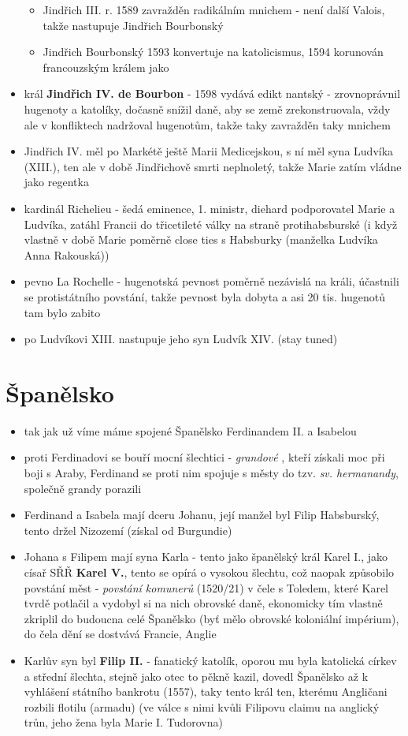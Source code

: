 \documentclass{article}
\begin{document}
\begin{itemize}
\begin{itemize}
    \item Jindřich III. r. 1589 zavražděn radikálním mnichem - není další Valois, takže nastupuje Jindřich Bourbonský
    \item Jindřich Bourbonský 1593 konvertuje na katolicismus, 1594 korunován francouzským králem jako
  \end{itemize}
  \item král \textbf{Jindřich IV. de Bourbon} - 1598 vydává edikt nantský - zrovnoprávnil hugenoty a katolíky, dočasně snížil daně, aby se země zrekonstruovala, vždy ale v konfliktech nadržoval hugenotům, takže taky zavražděn taky mnichem
  \item Jindřich IV. měl po Markétě ještě Marii Medicejskou, s ní měl syna Ludvíka (XIII.), ten ale v době Jindřichově smrti neplnoletý, takže Marie zatím vládne jako regentka
  \item kardinál Richelieu - šedá eminence, 1. ministr, diehard podporovatel Marie a Ludvíka, zatáhl Francii do třicetileté války na straně protihabsburské (i když vlastně v době Marie poměrně close ties s Habsburky (manželka Ludvíka Anna Rakouská))
  \item pevno La Rochelle - hugenotská pevnost poměrně nezávislá na králi, účastnili se protistátního povstání, takže pevnost byla dobyta a asi 20 tis. hugenotů tam bylo zabito
  \item po Ludvíkovi XIII. nastupuje jeho syn Ludvík XIV. (stay tuned)
\end{itemize}

\section{Španělsko}
\begin{itemize}
  \item tak jak už víme máme spojené Španělsko Ferdinandem II. a Isabelou
  \item proti Ferdinadovi se bouří mocní šlechtici - \textit{grandové} , kteří získali moc při boji s Araby, Ferdinand se proti nim spojuje s městy do tzv. \textit{sv. hermanandy}, společně grandy porazili
  \item Ferdinand a Isabela mají dceru Johanu, její manžel byl Filip Habsburský, tento držel Nizozemí (získal od Burgundie)
  \item Johana s Filipem mají syna Karla - tento jako španělský král Karel I., jako císař SŘŘ \textbf{Karel V.}, tento se opírá o vysokou šlechtu, což naopak způsobilo povstání měst - \textit{povstání komunerů} (1520/21) v čele s Toledem, které Karel tvrdě potlačil a vydobyl si na nich obrovské daně, ekonomicky tím vlastně zkriplil do budoucna celé Španělsko (byť mělo obrovské koloniální impérium), do čela dění se dostvává Francie, Anglie
  \item Karlův syn byl \textbf{Filip II.} - fanatický katolík, oporou mu byla katolická církev a střední šlechta, stejně jako otec to pěkně kazil, dovedl Španělsko až k vyhlášení státního bankrotu (1557), taky tento král ten, kterému Angličani rozbili flotilu (armadu) (ve válce s nimi kvůli Filipovu claimu na anglický trůn, jeho žena byla Marie I. Tudorovna)
\end{itemize}
\end{document}
